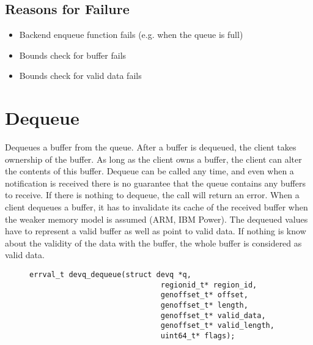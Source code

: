 \documentclass[a4paper,11pt,twoside]{report}
\begin{document}
{{	\subsection*{Reasons for Failure}
	\begin{itemize}
		\item Backend enqueue function fails (e.g. when the queue is full)
		\item Bounds check for buffer fails
		\item Bounds check for valid data fails
	\end{itemize}
	
	\section{Dequeue}
	Dequeues a buffer from the queue. After a buffer is dequeued, the client
	takes ownership of the buffer. As long as the client owns a buffer, the
	client can alter the contents of this buffer. Dequeue can be called any time,
	and even when a notification is received there is no guarantee that the queue contains any buffers
	to receive. If there is nothing to dequeue, the call will return an error. When a client
	dequeues a buffer, it has to invalidate its cache of the received buffer when
	the weaker memory model is assumed (ARM, IBM Power). The dequeued values 
	have to represent a valid buffer as well as point to valid data. If nothing 
	is know about the validity of the data with the buffer, the whole buffer 
	is considered as valid data.

	\begin{figure}[h]
		\begin{lstlisting}[style=code]
		errval_t devq_dequeue(struct devq *q,
		                      regionid_t* region_id,
		                      genoffset_t* offset,
		                      genoffset_t* length,
		                      genoffset_t* valid_data,
		                      genoffset_t* valid_length,
		                      uint64_t* flags);
		\end{lstlisting}
		\label{lst:dequeue}
	\end{figure}
}}
\end{document}
